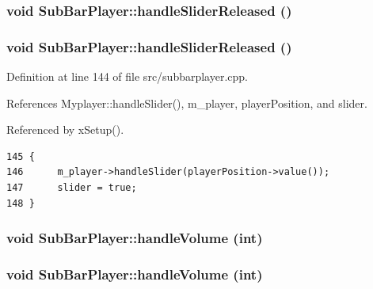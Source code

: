 \subsubsection{\setlength{\rightskip}{0pt plus 5cm}void Sub\-Bar\-Player::handle\-Slider\-Released ()\hspace{0.3cm}{\tt  [slot]}}\label{classSubBarPlayer_SubBarPlayeri20}


\subsubsection{\setlength{\rightskip}{0pt plus 5cm}void Sub\-Bar\-Player::handle\-Slider\-Released ()\hspace{0.3cm}{\tt  [slot]}}\label{classSubBarPlayer_SubBarPlayeri2}




Definition at line 144 of file src/subbarplayer.cpp.

References Myplayer::handle\-Slider(), m\_\-player, player\-Position, and slider.

Referenced by x\-Setup().



\footnotesize\begin{verbatim}145 {
146      m_player->handleSlider(playerPosition->value());
147      slider = true;   
148 }
\end{verbatim}\normalsize 
{}
\subsubsection{\setlength{\rightskip}{0pt plus 5cm}void Sub\-Bar\-Player::handle\-Volume (int)\hspace{0.3cm}{\tt  [slot]}}\label{classSubBarPlayer_SubBarPlayeri19}


\subsubsection{\setlength{\rightskip}{0pt plus 5cm}void Sub\-Bar\-Player::handle\-Volume (int)\hspace{0.3cm}{\tt  [slot]}}\label{classSubBarPlayer_SubBarPlayeri1}




